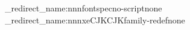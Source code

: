 \RequirePackage{etoolbox}

\ExplSyntaxOn
\msg_redirect_name:nnn{fontspec}{no-script}{none}
\msg_redirect_name:nnn{xeCJK}{CJKfamily-redef}{none}
\ExplSyntaxOff

